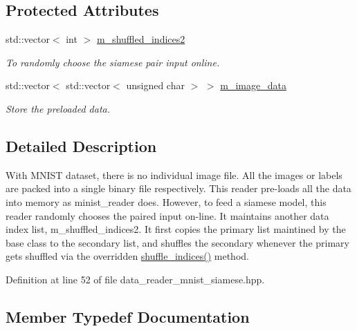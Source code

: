 \subsection*{Protected Attributes}
\begin{DoxyCompactItemize}
\item 
std\+::vector$<$ int $>$ \hyperlink{classlbann_1_1data__reader__mnist__siamese_a42a4b1513a7305cc62d219ac0d9473c3}{m\+\_\+shuffled\+\_\+indices2}
\begin{DoxyCompactList}\small\item\em To randomly choose the siamese pair input online. \end{DoxyCompactList}\item 
std\+::vector$<$ std\+::vector$<$ unsigned char $>$ $>$ \hyperlink{classlbann_1_1data__reader__mnist__siamese_a5b664a53047546c1be6d19ecabbd30dc}{m\+\_\+image\+\_\+data}
\begin{DoxyCompactList}\small\item\em Store the preloaded data. \end{DoxyCompactList}\end{DoxyCompactItemize}


\subsection{Detailed Description}
With M\+N\+I\+ST dataset, there is no individual image file. All the images or labels are packed into a single binary file respectively. This reader pre-\/loads all the data into memory as minist\+\_\+reader does. However, to feed a siamese model, this reader randomly chooses the paired input on-\/line. It maintains another data index list, \textquotesingle{}m\+\_\+shuffled\+\_\+indices2\textquotesingle{}. It first copies the primary list maintined by the base class to the secondary list, and shuffles the secondary whenever the primary gets shuffled via the overridden \hyperlink{classlbann_1_1data__reader__mnist__siamese_ad1949fc1a71af86d792e927c0181f87d}{shuffle\+\_\+indices()} method. 

Definition at line 52 of file data\+\_\+reader\+\_\+mnist\+\_\+siamese.\+hpp.



\subsection{Member Typedef Documentation}
\mbox{\label{classlbann_1_1data__reader__mnist__siamese_abc3253e1de3910bef9e317ef5a396a47}} 

